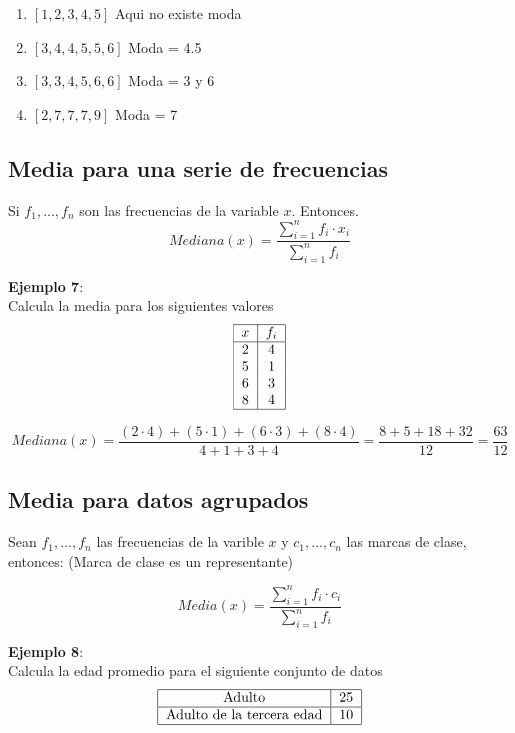 \documentclass{article}
\begin{document}
\begin{enumerate}
    \item $[1,2,3,4,5]$ Aqui no existe moda
    \item $[3,4,4,5,5,6]$ Moda = 4.5
    \item $[3,3,4,5,6,6]$ Moda = 3 y 6
    \item $[2,7,7,7,9]$ Moda = 7
\end{enumerate}

\subsection{Media para una serie de frecuencias}

Si $f_1, ... , f_n$ son las frecuencias de la variable $x$. Entonces.
\[
    Mediana(x) = \frac{\sum^{n}_{i=1}f_i \cdot x_i}{\sum^{n}_{i=1}f_i}
\]


\textbf{Ejemplo 7}: \\
Calcula la media para los siguientes valores
\[
    \begin{tabular}{|c|c|}
        \hline
        $x$ & $f_i$ \\
        \hline
        2   & 4     \\
        5   & 1     \\
        6   & 3     \\
        8   & 4     \\
        \hline
    \end{tabular}
\]

\[
    Mediana(x) = \frac{(2\cdot4) + (5\cdot1) + (6\cdot3) + (8\cdot4)}{4+1+3+4} = \frac{8+5+18+32}{12} = \frac{63}{12}
\]

\subsection{Media para datos agrupados}

Sean $f_1, ... , f_n$ las frecuencias de la varible $x$ y $c_1, ... , c_n$ las marcas de clase, entonces: (Marca de clase es un representante)

\[
    Media(x) = \frac{\sum^{n}_{i=1}f_i \cdot c_i}{\sum^{n}_{i=1}f_i}
\]

\textbf{Ejemplo 8}: \\
Calcula la edad promedio para el siguiente conjunto de datos
\[
    \begin{tabular}{|c|c|}
        \hline
        Adulto                    & 25 \\
        \hline
        Adulto de la tercera edad & 10 \\
        \hline
    \end{tabular}
\]
\end{document}
